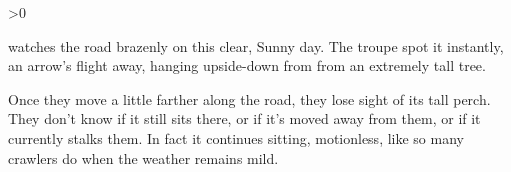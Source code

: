 \ifnum\value{temperature}>0


\chitincrawler

 watches the road brazenly on this clear, Sunny day.
The troupe spot it instantly, an arrow's flight away, hanging upside-down from from an extremely tall tree.

Once they move a little farther along the road, they lose sight of its tall perch.
They don't know if it still sits there, or if it's moved away from them, or if it currently stalks them.
In fact it continues sitting, motionless, like so many \glspl{crawler} do when the weather remains mild.


\fi
